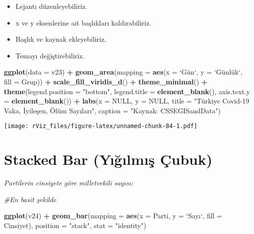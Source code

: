 \documentclass[
]{book}
\newenvironment{Shaded}{\begin{snugshade}}{\end{snugshade}}
\newcommand{\CommentTok}[1]{\textcolor[rgb]{0.56,0.35,0.01}{\textit{#1}}}
\newcommand{\DataTypeTok}[1]{\textcolor[rgb]{0.13,0.29,0.53}{#1}}
\newcommand{\KeywordTok}[1]{\textcolor[rgb]{0.13,0.29,0.53}{\textbf{#1}}}
\newcommand{\NormalTok}[1]{#1}
\newcommand{\OperatorTok}[1]{\textcolor[rgb]{0.81,0.36,0.00}{\textbf{#1}}}
\newcommand{\OtherTok}[1]{\textcolor[rgb]{0.56,0.35,0.01}{#1}}
\newcommand{\StringTok}[1]{\textcolor[rgb]{0.31,0.60,0.02}{#1}}
\begin{document}
\begin{itemize}
\item
  Lejantı düzenleyebiliriz.
\item
  x ve y eksenlerine ait başlıkları kaldırabiliriz.
\item
  Başlık ve kaynak ekleyebiliriz.
\item
  Temayı değiştirebiliriz.
\end{itemize}

\begin{Shaded}
\begin{Highlighting}[]
\KeywordTok{ggplot}\NormalTok{(}\DataTypeTok{data =}\NormalTok{ v23) }\OperatorTok{+}
\StringTok{  }\KeywordTok{geom_area}\NormalTok{(}\DataTypeTok{mapping =} \KeywordTok{aes}\NormalTok{(}\DataTypeTok{x =} \StringTok{`}\DataTypeTok{Gün`, y = }\StringTok{`}\NormalTok{Günlük`, }\DataTypeTok{fill =}\NormalTok{ Grup)) }\OperatorTok{+}
\StringTok{  }\KeywordTok{scale_fill_viridis_d}\NormalTok{() }\OperatorTok{+}
\StringTok{  }\KeywordTok{theme_minimal}\NormalTok{() }\OperatorTok{+}
\StringTok{  }\KeywordTok{theme}\NormalTok{(}\DataTypeTok{legend.position =} \StringTok{"bottom"}\NormalTok{,}
        \DataTypeTok{legend.title =} \KeywordTok{element_blank}\NormalTok{(),}
        \DataTypeTok{axis.text.y =} \KeywordTok{element_blank}\NormalTok{()) }\OperatorTok{+}
\StringTok{  }\KeywordTok{labs}\NormalTok{(}\DataTypeTok{x =} \OtherTok{NULL}\NormalTok{,}
       \DataTypeTok{y =} \OtherTok{NULL}\NormalTok{,}
       \DataTypeTok{title =} \StringTok{"Türkiye Covid-19 Vaka, İyileşen, Ölüm Sayıları"}\NormalTok{,}
       \DataTypeTok{caption =} \StringTok{"Kaynak: CSSEGISandData"}\NormalTok{)}
\end{Highlighting}
\end{Shaded}

\texttt{[image: rViz\_files/figure-latex/unnamed-chunk-84-1.pdf]}

\hypertarget{stacked-bar-yux131ux11fux131lmux131ux15f-uxe7ubuk}{%
\section{Stacked Bar (Yığılmış Çubuk)}\label{stacked-bar-yux131ux11fux131lmux131ux15f-uxe7ubuk}}

\emph{Partilerin cinsiyete göre milletvekili sayısı:}

\begin{Shaded}
\begin{Highlighting}[]
\CommentTok{#En basit şekilde}

\KeywordTok{ggplot}\NormalTok{(v24) }\OperatorTok{+}\StringTok{ }
\StringTok{    }\KeywordTok{geom_bar}\NormalTok{(}\DataTypeTok{mapping =} \KeywordTok{aes}\NormalTok{(}\DataTypeTok{x =}\NormalTok{ Parti, }\DataTypeTok{y =} \StringTok{`}\DataTypeTok{Sayı}\StringTok{`}\NormalTok{, }\DataTypeTok{fill =}\NormalTok{ Cinsiyet), }\DataTypeTok{position =} \StringTok{"stack"}\NormalTok{, }\DataTypeTok{stat =} \StringTok{"identity"}\NormalTok{)}
\end{Highlighting}
\end{Shaded}
\end{document}
